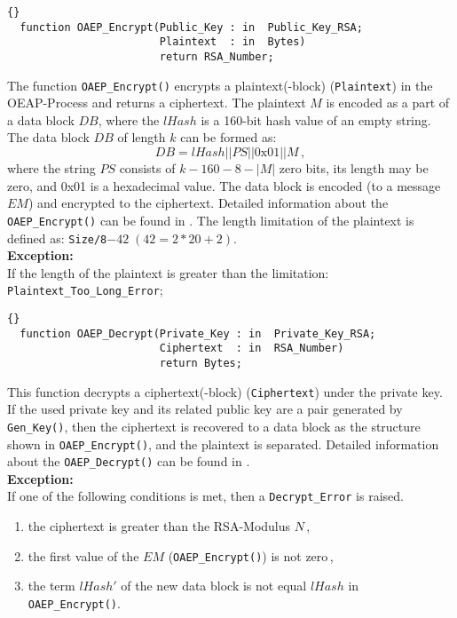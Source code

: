 \hhline
\begin{lstlisting}{}
  function OAEP_Encrypt(Public_Key : in  Public_Key_RSA;
                        Plaintext  : in  Bytes)
                        return RSA_Number;
\end{lstlisting}
The function \texttt{OAEP\_Encrypt()} encrypts a plaintext(-block)
(\texttt{Plaintext}) in the OEAP-Process and returns a ciphertext.
The plaintext $M$ is encoded as a part of a data block $DB$, where the
$lHash$ is a 160-bit hash value of an empty string. The data block
$DB$ of length $k$ can be formed as:
\begin{equation*}
DB=lHash||PS||0\mbox{x}01||M\,,
\end{equation*}
where the string $PS$ consists of $k-160-8-|M|$ zero bits, its length
may be zero, and 0x01 is a hexadecimal value. The data block is
encoded (to a message $EM$) and encrypted to the ciphertext.  Detailed
information about the \texttt{OAEP\_Encrypt()} can be found in
\cite{PKCS}. The length limitation of the plaintext is defined as:
\texttt{Size/8}$-42\;(42=2*20+2)$.\\

\noindent\textbf{Exception:}\\
If the length of the plaintext is greater than the limitation:\quad
\texttt{Plaintext\_Too\_Long\_Error};

\hhline
\begin{lstlisting}{}
  function OAEP_Decrypt(Private_Key : in  Private_Key_RSA;
                        Ciphertext  : in  RSA_Number)
                        return Bytes;
\end{lstlisting}
This function decrypts a ciphertext(-block) (\texttt{Ciphertext})
under the private key. If the used private key and its related public
key are a pair generated by \texttt{Gen\_Key()}, then the ciphertext
is recovered to a data block as the structure shown in
\texttt{OAEP\_Encrypt()}, and the plaintext is separated. Detailed
information about the \texttt{OAEP\_Decrypt()} can be found in
\cite{PKCS}.\\

\noindent\textbf{Exception:}\\
If one of the following conditions is
met, then a \texttt{Decrypt\_Error} is raised.
\begin{enumerate}
\item the ciphertext is greater
 than the RSA-Modulus $N$\,,
\item the first value of the $EM$
 (\texttt{OAEP\_Encrypt()}) is not zero\,,
\item the term $lHash'$ of the new data block is not equal $lHash$ in
  \texttt{OAEP\_Encrypt()}.
\end{enumerate}

